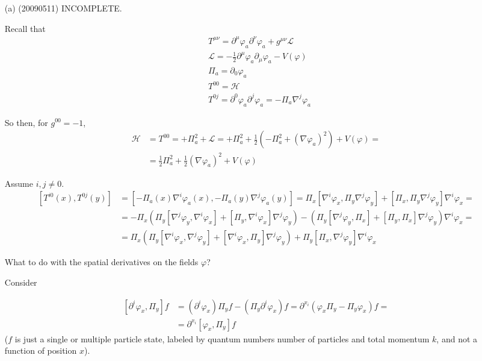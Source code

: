 \documentclass[twoside]{amsart}
\newcommand{\solutionhead}[1]
  {\smallskip
   \noindent{\large\bf Solution #1.}
   }
\begin{document}
\solutionhead{22.3} \begin{itemize}
\item[(a)]  (20090511) INCOMPLETE.  

Recall that 
\[
\begin{aligned}
  & T^{\mu \nu} = \partial^{\mu} \varphi_a \partial^{\nu} \varphi_a + g^{\mu \nu} \mathcal{L} \\ 
  & \mathcal{L}  = - \frac{1}{2} \partial^{\mu} \varphi_a \partial_{\mu} \varphi_a - V(\varphi) \\ 
  & \Pi_a = \partial_0 \varphi_a \\ 
  & T^{00} = \mathcal{H} \\ 
  & T^{0j} = \partial^0 \varphi_a \partial^j \varphi_a = - \Pi_a \nabla^j \varphi_a
\end{aligned}
\]

So then, for $g^{00} =-1$,
\[
\begin{aligned}
  \mathcal{H} & = T^{00} = + \Pi_a^2 + \mathcal{L} = + \Pi_a^2 + \frac{1}{2} ( - \Pi_a^2 + (\nabla \varphi_a)^2 ) + V(\varphi) = \\
 & = \frac{1}{2} \Pi_a^2 + \frac{1}{2} ( \nabla \varphi_a)^2 + V(\varphi)
\end{aligned}
\]

Assume $i,j \neq 0$.  
\[
\begin{aligned}
  \left[ T^{i0}(x), T^{0j}(y) \right] & = [ - \Pi_a(x) \nabla^i \varphi_a(x), -\Pi_a(y) \nabla^j \varphi_a(y) ] = \Pi_x [ \nabla^i \varphi_x , \Pi_y \nabla^j \varphi_y ] + [ \Pi_x, \Pi_y \nabla^j \varphi_y] \nabla^i \varphi_x = \\ 
  & = - \Pi_x \left( \Pi_y [ \nabla^j \varphi_y, \nabla^i \varphi_x] + [ \Pi_y, \nabla^i \varphi_x ] \nabla^j \varphi_y  \right) - \left( \Pi_y [ \nabla^j \varphi_y, \Pi_x ] + [ \Pi_y, \Pi_x ] \nabla^j \varphi_y \right) \nabla^i \varphi_x = \\
  &= \Pi_x ( \Pi_y [ \nabla^i \varphi_x, \nabla^j \varphi_y] + [ \nabla^i \varphi_x, \Pi_y] \nabla^j \varphi_y ) + \Pi_y [ \Pi_x, \nabla^j \varphi_y ] \nabla^i \varphi_x
\end{aligned}
\]

What to do with the spatial derivatives on the fields $\varphi$?

Consider 

\[
\begin{aligned}
  \left[ \partial^i \varphi_x, \Pi_y \right] f & = ( \partial^i \varphi_x) \Pi_y f - (\Pi_y \partial^i \varphi_x) f = \partial^{x_i} ( \varphi_x \Pi_y - \Pi_y \varphi_x ) f = \\ 
  & = \partial^{x_i} [ \varphi_x, \Pi_y] f
\end{aligned}
\]
($f$ is just a single or multiple particle state, labeled by quantum numbers number of particles and total momentum $k$, and not a function of position $x$).  


\end{itemize}
\end{document}

